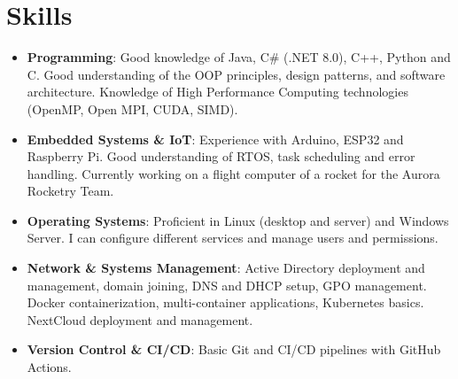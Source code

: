 \documentclass[letterpaper,11pt]{article}
\newcommand{\resumeItem}[2]{
  \item\small{
    \textbf{#1}{: #2 \vspace{-2pt}}
  }
}
\newcommand{\resumeSubHeadingListStart}{\begin{itemize}[leftmargin=*]}
\newcommand{\resumeSubHeadingListEnd}{\end{itemize}}
\begin{document}
\begin{comment}
\section{Languages}
    \resumeSubHeadingListStart
    \resumeItem
      {Italian}{Native speaker}
    \resumeItem
      {English}{Level C1}
  \resumeSubHeadingListEnd
\end{comment}

\section{Skills}
\resumeSubHeadingListStart
  \item{
    \textbf{Programming}{: Good knowledge of Java, C\# (.NET 8.0), C++, Python and C. 
      Good understanding of the OOP principles, design patterns, and software architecture.
      Knowledge of High Performance Computing technologies (OpenMP, Open MPI, CUDA, SIMD).}
    \hfill
    }
  \item{
    \textbf{Embedded Systems \& IoT}{: Experience with Arduino, ESP32 and Raspberry Pi. Good understanding of RTOS, task scheduling and error handling.
                                        Currently working on a flight computer of a rocket for the Aurora Rocketry Team.}
    \hfill
    }
  \item{
    \textbf{Operating Systems}{: Proficient in Linux (desktop and server) and Windows Server. I can configure different services and manage users and permissions.}
      \hfill
    }
  \item{
    \textbf{Network \& Systems Management}{: Active Directory deployment and management, domain joining, DNS and DHCP setup, GPO management. 
      Docker containerization, multi-container applications, Kubernetes basics. NextCloud deployment and management.}
    \hfill
    }
  \item{
      \textbf{Version Control \& CI/CD}{: Basic Git and CI/CD pipelines with GitHub Actions.}
      \hfill
    }
  \resumeSubHeadingListEnd

\end{document}
